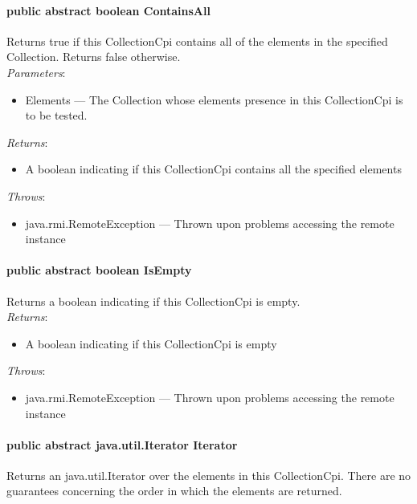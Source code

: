 \documentclass[$Date: 2003/06/26 19:29:31 $]{glabarticle}
\begin{document}
\paragraph{public abstract boolean ContainsAll}

Returns true if this CollectionCpi contains all of the elements in the
specified Collection. Returns false otherwise.\\

\textit{Parameters}:
\begin{itemize}
\item[] Elements --- The Collection whose elements presence in this CollectionCpi is to be tested. 
\end{itemize}

\textit{Returns}:
\begin{itemize}
\item[] A boolean indicating if this CollectionCpi contains all the specified elements
\end{itemize}

 \textit{Throws}:
 \begin{itemize}
 \item[] java.rmi.RemoteException --- Thrown upon problems accessing the remote instance 
 \end{itemize}

\paragraph{public abstract boolean IsEmpty}

Returns a boolean indicating if this CollectionCpi is empty.\\

\textit{Returns}:
\begin{itemize}
\item[] A boolean indicating if this CollectionCpi is empty
\end{itemize}

 \textit{Throws}:
 \begin{itemize}
 \item[] java.rmi.RemoteException --- Thrown upon problems accessing the remote instance 
 \end{itemize}

\paragraph{public abstract java.util.Iterator Iterator}

Returns an java.util.Iterator over the elements in this CollectionCpi. There are no
guarantees concerning the order in which the elements are returned.\\
\end{document}
